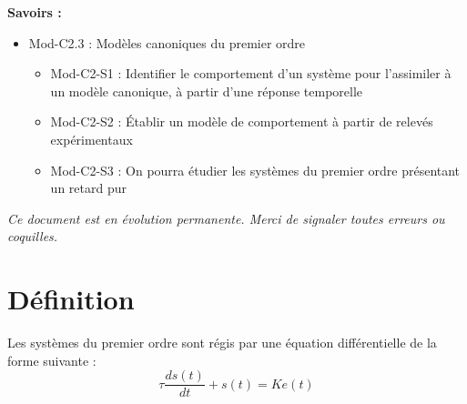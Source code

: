 \documentclass[11pt,oneside]{article}
\begin{document}
\begin{savoir}
\textbf{Savoirs :}
\begin{itemize}
\item Mod-C2.3 : Modèles canoniques du premier ordre
\begin{itemize}
\item Mod-C2-S1 : Identifier le comportement d’un système pour l’assimiler à un modèle canonique, à partir d’une réponse temporelle 
\item Mod-C2-S2 : Établir un modèle de comportement à partir de relevés expérimentaux
\item Mod-C2-S3 : On pourra étudier les systèmes du premier ordre présentant un retard pur
\end{itemize}
\end{itemize}
\end{savoir}



%


\setlength{\parskip}{0ex plus 0.2ex minus 0ex}
 \renewcommand{\contentsname}{}
 \renewcommand{\baselinestretch}{1}

\textit{Ce document est en évolution permanente. Merci de signaler toutes
erreurs ou coquilles.}

\tableofcontents

 \renewcommand{\baselinestretch}{1.2}
\setlength{\parskip}{2ex plus 0.5ex minus 0.2ex}


\section{Définition}

Les systèmes du premier ordre sont régis par une équation différentielle de la
forme suivante :
$$
\tau \dfrac{ds(t)}{dt}+s(t) = Ke(t)
$$
\end{document}
